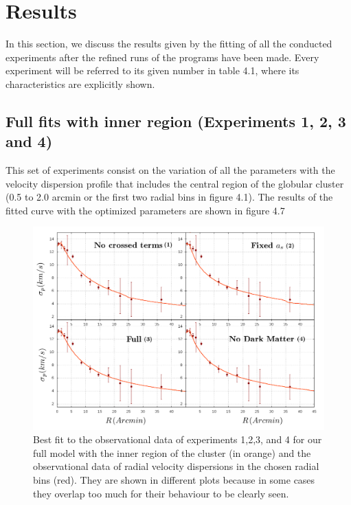 \section{Results}

In this section, we discuss the results given by the fitting of all the conducted experiments after the refined runs of the programs have been made. Every experiment will be referred to its given number in table 4.1, where its characteristics are explicitly shown.

\subsection{Full fits with inner region (Experiments 1, 2, 3 and 4)}

This set of experiments consist on the variation of all the parameters with the velocity dispersion profile that includes the central region of the globular cluster (0.5 to 2.0 arcmin or the first two radial bins in figure 4.1). The results of the fitted curve with the optimized parameters are shown in figure 4.7

\begin{figure}[]
\centering
\includegraphics[width=15cm]{images/all_params_refinado_12.png}
\caption[Best fit of the full model with the inner region]{Best fit to the observational data of experiments 1,2,3, and 4 for our full model with the inner region of the cluster (in orange) and the observational data of radial velocity dispersions in the chosen radial bins (red). They are shown in different plots because in some cases they overlap too much for their behaviour to be clearly seen.}

\end{figure}

